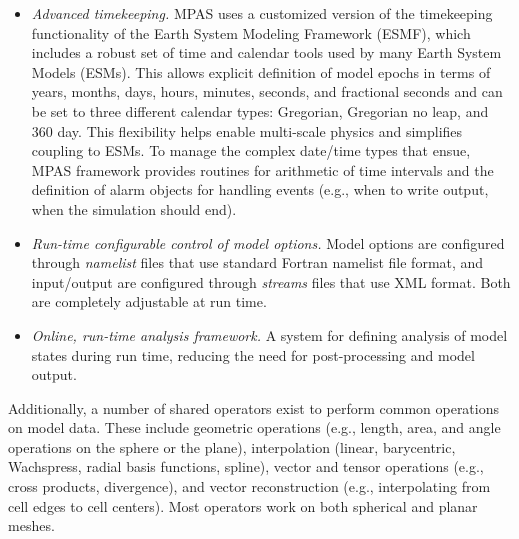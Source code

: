 \begin{itemize}
\item \textit{Advanced timekeeping.}  MPAS uses a customized version of the timekeeping functionality of the Earth System Modeling Framework (ESMF), which includes a robust set of time and calendar tools used by many Earth System Models (ESMs).   This allows explicit definition of model epochs in terms of years, months, days, hours, minutes, seconds, and fractional seconds and can be set to three different calendar types: Gregorian, Gregorian no leap, and 360 day.  This flexibility helps enable multi-scale physics and simplifies coupling to ESMs.  To manage the complex date/time types that ensue, MPAS framework provides routines for arithmetic of time intervals and the definition of alarm objects for handling events (e.g., when to write output, when the simulation should end).

\item \textit{Run-time configurable control of model options.}  Model options are configured through \emph{namelist} files that use standard Fortran namelist file format, and input/output are configured through \emph{streams} files that use XML format.  Both are completely adjustable at run time.

\item \textit{Online, run-time analysis framework.} A system for defining analysis of model states during run time, reducing the need for post-processing and model output.
\end{itemize}

Additionally, a number of shared operators exist to perform common operations on model data.
These include geometric operations (e.g., length, area, and angle operations on the sphere or the plane), interpolation (linear, barycentric, Wachspress, radial basis functions, spline), vector and tensor operations (e.g., cross products, divergence), and vector reconstruction (e.g., interpolating from cell edges to cell centers).
Most operators work on both spherical and planar meshes.

